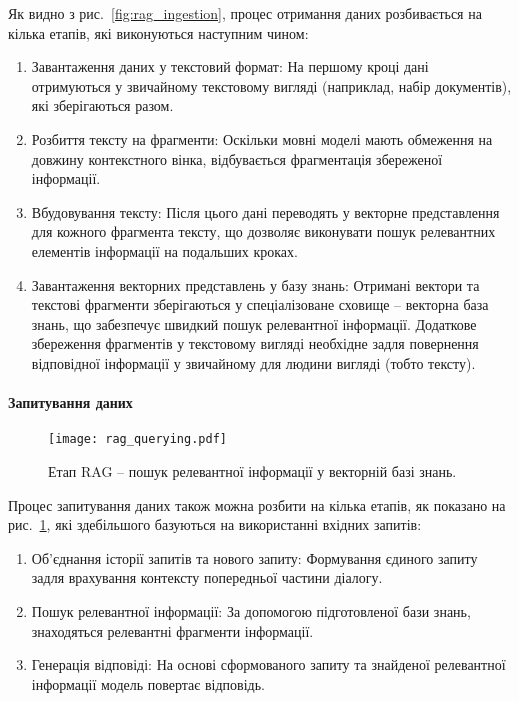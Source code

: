 Як видно з рис.~\ref{fig:rag_ingestion}, процес отримання даних розбивається на кілька етапів, які виконуються наступним чином:

\begin{enumerate}
    \item {Завантаження даних у текстовий формат}: На першому кроці дані отримуються у звичайному текстовому вигляді (наприклад, набір документів), які зберігаються разом.
    \item {Розбиття тексту на фрагменти}: Оскільки мовні моделі мають обмеження на довжину контекстного вінка, відбувається фрагментація збереженої інформації.
    \item {Вбудовування тексту}: Після цього дані переводять у векторне представлення для кожного фрагмента тексту, що дозволяє виконувати пошук релевантних елементів інформації на подальших кроках.
    \item {Завантаження векторних представлень у базу знань}: Отримані вектори та текстові фрагменти зберігаються у спеціалізоване сховище -- векторна база знань, що забезпечує швидкий пошук релевантної інформації. Додаткове збереження фрагментів у текстовому вигляді необхідне задля повернення відповідної інформації у звичайному для людини вигляді (тобто тексту).
\end{enumerate}

\paragraph{Запитування даних}

\begin{figure}[h]
    \centering
    \texttt{[image: rag\_querying.pdf]}
    \caption{Етап RAG -- пошук релевантної інформації у векторній базі знань.}
    \label{fig:rag_querying}
\end{figure}

Процес запитування даних також можна розбити на кілька етапів, як показано на рис.~\ref{fig:rag_querying}, які здебільшого базуються на використанні вхідних запитів:

\begin{enumerate}
    \item {Об'єднання історії запитів та нового запиту}: Формування єдиного запиту задля врахування контексту попередньої частини діалогу.
    \item {Пошук релевантної інформації}: За допомогою підготовленої бази знань, знаходяться релевантні фрагменти інформації.
    \item {Генерація відповіді}: На основі сформованого запиту та знайденої релевантної інформації модель повертає відповідь.
\end{enumerate}

